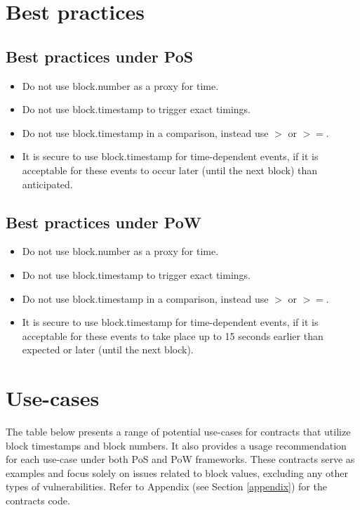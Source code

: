 \section{Best practices}
\subsection{Best practices under PoS}
\begin{itemize}
  \item Do not use block.number as a proxy for time.
  \item Do not use block.timestamp to trigger exact timings.
  \item Do not use block.timestamp in a comparison, instead use $>$ or $>=$.
  \item It is secure to use block.timestamp for time-dependent events, if it is acceptable for these events to occur later (until the next block) than anticipated. \\
\end{itemize}

\subsection{Best practices under PoW}
\begin{itemize}
  \item Do not use block.number as a proxy for time.
  \item Do not use block.timestamp to trigger exact timings.
  \item Do not use block.timestamp in a comparison, instead use $>$ or $>=$.
  \item It is secure to use block.timestamp for time-dependent events, if it is acceptable for these events to take place up to 15 seconds earlier than expected or later (until the next block). \\
\end{itemize}

\newpage
\section{Use-cases}

The table below presents a range of potential use-cases for contracts that
utilize block timestamps and block numbers. It also provides a usage recommendation
for each use-case under both PoS and PoW frameworks. These contracts serve as
examples and focus solely on issues related to block values, excluding any
other types of vulnerabilities. Refer to Appendix (see Section \ref{appendix})
for the contracts code.

